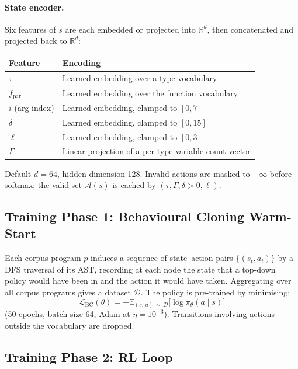 \documentclass[11pt,a4paper]{article}
\begin{document}
\paragraph{State encoder.}
Six features of $s$ are each embedded or projected into $\mathbb{R}^d$, then concatenated
and projected back to $\mathbb{R}^d$:

\begin{center}
\begin{tabular}{ll}
\toprule
Feature & Encoding \\
\midrule
$\tau$              & Learned embedding over a type vocabulary \\
$f_{\mathrm{par}}$  & Learned embedding over the function vocabulary \\
$i$ (arg index)     & Learned embedding, clamped to $[0,7]$ \\
$\delta$            & Learned embedding, clamped to $[0,15]$ \\
$\ell$              & Learned embedding, clamped to $[0,3]$ \\
$\Gamma$            & Linear projection of a per-type variable-count vector \\
\bottomrule
\end{tabular}
\end{center}

Default $d = 64$, hidden dimension 128. Invalid actions are masked to $-\infty$ before
softmax; the valid set $\mathcal{A}(s)$ is cached by $(\tau, \Gamma, \delta > 0, \ell)$.

\subsection{Training Phase 1: Behavioural Cloning Warm-Start}\label{sec:warmstart}

Each corpus program $p$ induces a sequence of state--action pairs $\{(s_t, a_t)\}$ by a
DFS traversal of its AST, recording at each node the state that a top-down policy would
have been in and the action it would have taken. Aggregating over all corpus programs
gives a dataset $\mathcal{D}$. The policy is pre-trained by minimising:
\[
  \mathcal{L}_{\mathrm{BC}}(\theta)
    = -\mathbb{E}_{(s,\, a)\,\sim\,\mathcal{D}}\bigl[\log \pi_\theta(a \mid s)\bigr]
\]
(50 epochs, batch size 64, Adam at $\eta = 10^{-3}$). Transitions involving actions
outside the vocabulary are dropped.

\subsection{Training Phase 2: RL Loop}\label{sec:rl-loop}
\end{document}
